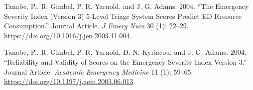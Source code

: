 \documentclass[
]{article}
\newlength{\cslhangindent}
\newlength{\cslentryspacingunit} %
\newenvironment{CSLReferences}[2] %
 {%
  \setlength{\parindent}{0pt}
  \ifodd #1
  \let\oldpar\par
  \def\par{\hangindent=\cslhangindent\oldpar}
  \fi
  \setlength{\parskip}{#2\cslentryspacingunit}
 }%
 {}
\begin{document}
\begin{CSLReferences}{1}{0}
\leavevmode{}%
Tanabe, P., R. Gimbel, P. R. Yarnold, and J. G. Adams. 2004. {``The
Emergency Severity Index (Version 3) 5-Level Triage System Scores
Predict ED Resource Consumption.''} Journal Article. \emph{J Emerg Nurs}
30 (1): 22--29. \url{https://doi.org/10.1016/j.jen.2003.11.004}.

\leavevmode{}%
Tanabe, P., R. Gimbel, P. R. Yarnold, D. N. Kyriacou, and J. G. Adams.
2004. {``Reliability and Validity of Scores on the Emergency Severity
Index Version 3.''} Journal Article. \emph{Academic Emergency Medicine}
11 (1): 59--65. \url{https://doi.org/10.1197/j.aem.2003.06.013}.

\end{CSLReferences}
\end{document}
